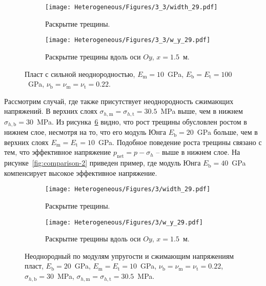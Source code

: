 \begin{figure}[htbp]
    \centering
    \begin{subfigure}[t]{0.4\textwidth}
        \centering
        \caption{Раскрытие трещины.}
        \label{fig:heterogeneous-3layer-planar}
        \texttt{[image: Heterogeneous/Figures/3\_3/width\_29.pdf]}
    \end{subfigure}
    \hfill 
    \begin{subfigure}[t]{0.55\textwidth}
        \centering
        \caption{Раскрытие трещины вдоль оси $Oy$, $x=1.5$~м.}
        \label{fig:heterogeneous-3layer-slice}
        \texttt{[image: Heterogeneous/Figures/3\_3/w\_y\_29.pdf]}
    \end{subfigure}
    \caption{Пласт с сильной неоднородностью, $E_\text{m} = 10$~GPa, $E_\text{b} = E_\text{t} = 100$~GPa, $\nu_\text{b} = \nu_\text{m} = \nu_\text{t} = 0.22$.}
    \label{fig:heterogeneous-3layer}
\end{figure}


Рассмотрим случай, где также присутствует неоднородность сжимающих напряжений. В верхних слоях $\sigma_{h,\text{m}} = \sigma_{h,\text{t}} = 30.5$~MPa выше, чем в нижнем $\sigma_{h,\text{b}} = 30$~MPa. Из рисунка~\ref{fig:comparison-1} видно, что рост трещины обусловлен ростом в нижнем слое, несмотря на то, что его модуль Юнга $E_\text{b} = 20$~GPa больше, чем в верхних слоях $E_\text{m} = E_\text{t} = 10$~GPa. Подобное поведение роста трещины связано с тем, что эффективное напряжение $p_\text{net} = p - \sigma_h$ -- выше в нижнем слое. На рисунке~\ref{fig:comparison-2} приведен пример, где модуль Юнга $E_\text{b} = 40$~GPa компенсирует высокое эффективное напряжение.

\begin{figure}[htbp]
    \centering
    \begin{subfigure}[t]{0.4\textwidth}
        \centering
        \caption{Раскрытие трещины.}
        \label{fig:comparison-1-planar}
        \texttt{[image: Heterogeneous/Figures/3/width\_29.pdf]}
    \end{subfigure}
    \hfill 
    \begin{subfigure}[t]{0.55\textwidth}
        \centering
        \caption{Раскрытие трещины вдоль оси $Oy$, $x=1.5$~м.}
        \label{fig:comparison-1-slice}
        \texttt{[image: Heterogeneous/Figures/3/w\_y\_29.pdf]}
    \end{subfigure}
    \caption{Неоднородный по модулям упругости и сжимающим напряжениям пласт, $E_\text{b} = 20$~GPa, $E_\text{m} = E_\text{t} = 10$~GPa, $\nu_\text{b} = \nu_\text{m} = \nu_\text{t} = 0.22$, $\sigma_{h,\text{b}} = 30$~MPa, $\sigma_{h,\text{m}} = \sigma_{h,\text{t}} = 30.5$~MPa.}
    \label{fig:comparison-1}
\end{figure}



